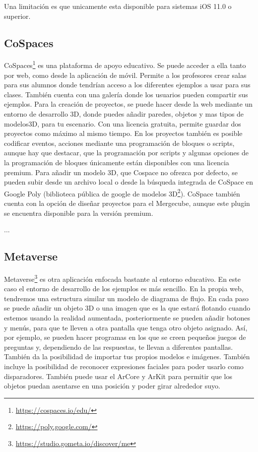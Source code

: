 Una limitación es que unicamente esta disponible para sistemas iOS 11.0 o superior.


\subsection{CoSpaces} CoSpaces\footnote{\url{https://cospaces.io/edu/}} es una plataforma de apoyo educativo. Se puede acceder a ella tanto por web, como desde la aplicación de móvil. Permite a los profesores crear salas para sus alumnos donde tendrían acceso a los diferentes ejemplos a usar para sus clases. También cuenta con una galería donde los usuarios pueden compartir sus ejemplos.
Para la creación de proyectos, se puede hacer desde la web mediante un entorno de desarrollo 3D, donde puedes añadir paredes, objetos y mas tipos de modelos3D, para tu escenario. Con una licencia gratuita, permite guardar dos proyectos como máximo al mismo tiempo. En los proyectos también es posible codificar eventos, acciones mediante una programación de bloques o scripts, aunque hay que destacar, que la programación por scripts y algunas opciones de la programación de bloques únicamente están disponibles con una licencia premium. Para añadir un modelo 3D, que Cospace no ofrezca por defecto, se pueden subir desde un archivo local o desde la búsqueda integrada de CoSpace en Google Poly (biblioteca pública de google de modelos 3D\footnote{\url{https://poly.google.com/}}).
CoSpace también cuenta con la opción de diseñar proyectos para el Mergecube, aunque este plugin se encuentra disponible para la versión premium.

...

\subsection{Metaverse} Metaverse\footnote{\url{https://studio.gometa.io/discover/me}} es otra aplicación enfocada bastante al entorno educativo. En este caso el entorno de desarrollo de los ejemplos es más sencillo. En la propia web, tendremos una estructura similar un modelo de diagrama de flujo. En cada paso se puede añadir un objeto 3D o una imagen que es la que estará flotando cuando estemos usando la realidad aumentada, posteriormente se pueden añadir botones y menús, para que te lleven a otra pantalla que tenga otro objeto asignado. Así, por ejemplo, se pueden hacer programas en los que se creen pequeños juegos de preguntas y, dependiendo de las respuestas, te llevan a diferentes pantallas.
También da la posibilidad de importar tus propios modelos e imágenes.
También incluye la posibilidad de reconocer expresiones faciales para poder usarlo como disparadores.
También puede usar el ArCore y ArKit para permitir que los objetos puedan asentarse en una posición y poder girar alrededor suyo.

